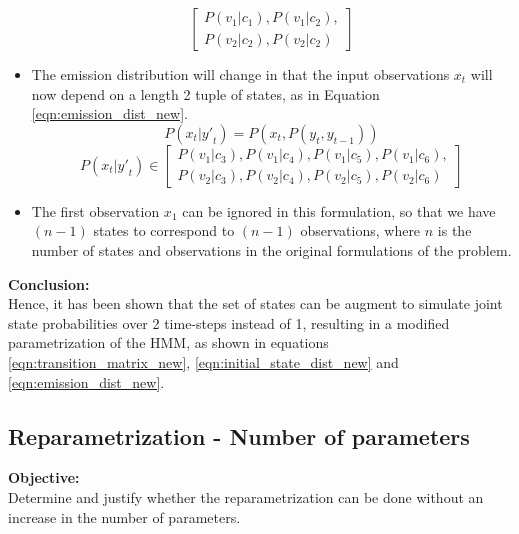 \documentclass[parskip=half]{scrartcl}
\begin{document}
\begin{itemize}
\begin{equation}
\begin{bmatrix}
                    P(v_1|c_1), P(v_1|c_2), \\
                    P(v_2|c_2), P(v_2|c_2)
                \end{bmatrix}
            \end{equation}
            \item 
            The emission distribution will change in that the input observations $x_t$ will now depend on a length 2 tuple of states, as in Equation \ref{eqn:emission_dist_new}. 
            $$P(x_t | {y\prime}_t) = P(x_t, P(y_t, y_{t-1}))$$
            \begin{equation} \label{eqn:emission_dist_new}
                P(x_t | {y\prime}_t) 
                \in 
                \begin{bmatrix}
                    P(v_1|c_3), P(v_1|c_4), P(v_1|c_5), P(v_1|c_6), \\
                    P(v_2|c_3), P(v_2|c_4), P(v_2|c_5), P(v_2|c_6)
                \end{bmatrix}
            \end{equation}
            \item 
            The first observation $x_1$ can be ignored in this formulation, so that we have $(n-1)$ states to correspond to $(n-1)$ observations, where $n$ is the number of states and observations in the original formulations of the problem.
        \end{itemize}

        \textbf{Conclusion:}\\
        Hence, it has been shown that the set of states can be augment to simulate joint state probabilities over 2 time-steps instead of 1, resulting in a modified parametrization of the HMM, as shown in equations \ref{eqn:transition_matrix_new}, \ref{eqn:initial_state_dist_new} and \ref{eqn:emission_dist_new}.
    


    \subsection{Reparametrization - Number of parameters} %
    \label{sub:reparametrization_number_of_parameters}

        \textbf{Objective:}\\
        Determine and justify whether the reparametrization can be done without an increase in the number of parameters.
\end{document}
